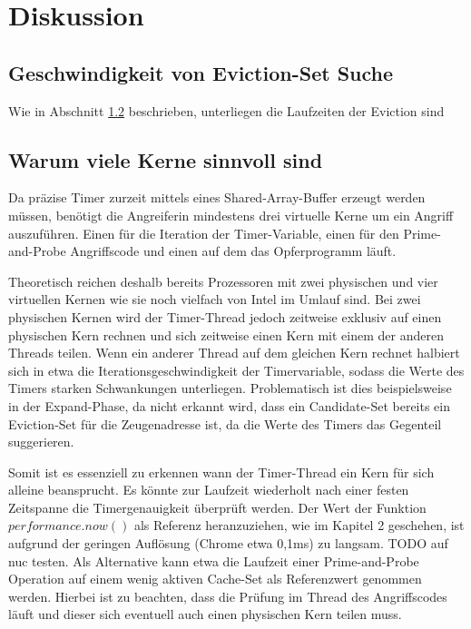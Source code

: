 \chapter{Diskussion}
\label{chapter:discussion}



\section{Geschwindigkeit von Eviction-Set Suche}
Wie in Abschnitt \ref{} beschrieben, unterliegen die Laufzeiten der Eviction sind


\section{Warum viele Kerne sinnvoll sind}
Da präzise Timer zurzeit mittels eines Shared-Array-Buffer erzeugt werden müssen, benötigt die Angreiferin mindestens drei virtuelle Kerne um ein Angriff auszuführen. Einen für die Iteration der Timer-Variable, einen für den Prime-and-Probe Angriffscode und einen auf dem das Opferprogramm läuft.

Theoretisch reichen deshalb bereits Prozessoren mit zwei physischen und vier virtuellen Kernen wie sie noch vielfach von Intel im Umlauf sind. Bei zwei physischen Kernen wird der Timer-Thread jedoch zeitweise exklusiv auf einen physischen Kern rechnen und sich zeitweise einen Kern mit einem der anderen Threads teilen.
Wenn ein anderer Thread auf dem gleichen Kern rechnet halbiert sich in etwa die Iterationsgeschwindigkeit der Timervariable, sodass die Werte des Timers starken Schwankungen unterliegen.
Problematisch ist dies beispielsweise in der Expand-Phase, da nicht erkannt wird, dass ein Candidate-Set bereits ein Eviction-Set für die Zeugenadresse ist, da die Werte des Timers das Gegenteil suggerieren.

Somit ist es essenziell zu erkennen wann der Timer-Thread ein Kern für sich alleine beansprucht.
Es könnte zur Laufzeit wiederholt nach einer festen Zeitspanne die Timergenauigkeit überprüft werden.
Der Wert der Funktion $performance.now()$ als Referenz heranzuziehen, wie im Kapitel 2 geschehen, ist aufgrund der geringen Auflösung (Chrome etwa 0,1ms) zu langsam.
TODO auf nuc testen.
Als Alternative kann etwa die Laufzeit einer Prime-and-Probe Operation auf einem wenig aktiven Cache-Set als Referenzwert genommen werden.
Hierbei ist zu beachten, dass die Prüfung im Thread des Angriffscodes läuft und dieser sich eventuell auch einen physischen Kern teilen muss.

